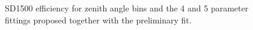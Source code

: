 \documentclass[12pt,a4paper]{article}
\begin{document}
\begin{figure}[H]
    \center
    \caption{SD1500 efficiency for zenith angle bins and the 4 and 5 parameter fittings proposed together with the preliminary fit.
    \label{fig:zenith}}
\end{figure}
\end{document}
